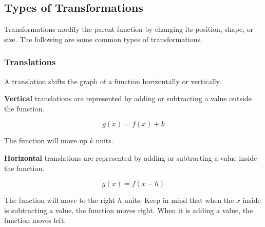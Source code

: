 \documentclass[11pt]{article}
\begin{document}
\subsection{Types of Transformations}

Transformations modify the parent function by changing its position, shape, or size. The following are some common types of transformations.

\subsubsection{Translations}

A translation shifts the graph of a function horizontally or vertically. 

\textbf{Vertical} translations are represented by adding or subtracting a value outside the function.

\begin{equation*}
    g(x) = f(x) + k    
\end{equation*}

The function will move up $k$ units.

\begin{center}
\end{center}

\textbf{Horizontal} translations are represented by adding or subtracting a value inside the function.

\begin{equation*}
    g(x) = f(x - h)
\end{equation*}

The function will move to the right $h$ units. Keep in mind that when the $x$ inside is subtracting a value, the function moves right. When it is adding a value, the function moves left.

\begin{center}
\end{center}
\end{document}
